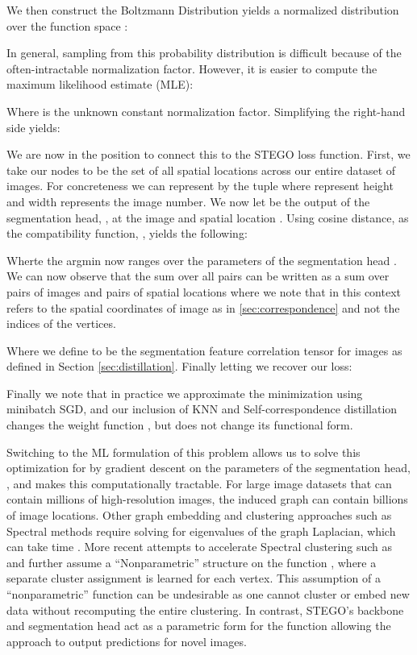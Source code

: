 \documentclass{article} \usepackage{iclr2022_conference,times}
\begin{document}
We then construct the Boltzmann Distribution \citep{hinton2002training} yields a normalized distribution over the function space :



In general, sampling from this probability distribution is difficult because of the often-intractable normalization factor. However, it is easier to compute the maximum likelihood estimate (MLE):



Where  is the unknown constant normalization factor. Simplifying the right-hand side yields: 



We are now in the position to connect this to the STEGO loss function. First, we take our nodes  to be the set of all spatial locations across our entire dataset of images. For concreteness we can represent  by the tuple  where  represent height and width  represents the image number. We now let  be the output of the segmentation head, , at the image and spatial location . Using cosine distance,   as the compatibility function, , yields the following:



Wherte the argmin now ranges over the parameters of the segmentation head . We can now observe that the sum over all pairs  can be written as a sum over pairs of images  and pairs of spatial locations  where we note that  in this context refers to the spatial coordinates of image  as in \ref{sec:correspondence} and not the indices of the vertices. 



Where we define  to be the segmentation feature correlation tensor for images  as defined in Section \ref{sec:distillation}. Finally letting  we recover our loss:



Finally we note that in practice we approximate the minimization using minibatch SGD, and our inclusion of KNN and Self-correspondence distillation changes the weight function , but does not change its functional form. 

Switching to the ML formulation of this problem allows us to solve this optimization for  by gradient descent on the parameters of the segmentation head, , and makes this computationally tractable. For large image datasets that can contain millions of high-resolution images, the induced graph can contain billions of image locations. Other graph embedding and clustering approaches such as Spectral methods require solving for eigenvalues of the graph Laplacian, which can take  time \citep{yan2009fast}. More recent attempts to accelerate Spectral clustering such as \citep{yan2009fast} and \citep{han2017mini} further assume a ``Nonparametric'' structure on the function , where a separate cluster assignment is learned for each vertex. This assumption of a ``nonparametric'' function  can be undesirable as one cannot cluster or embed new data without recomputing the entire clustering. In contrast, STEGO's backbone and segmentation head act as a parametric form for the function  allowing the approach to output predictions for novel images.
\end{document}

